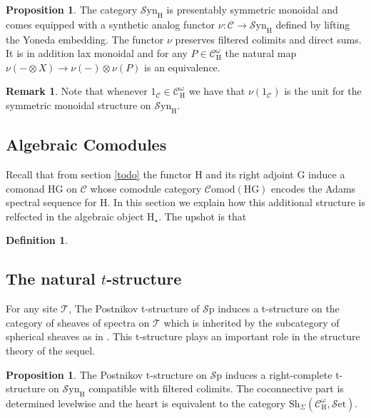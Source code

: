 \documentclass[10pt]{amsart}
\theoremstyle{definition}
\numberwithin{figure}{section}
\numberwithin{equation}{section}
\newtheorem{proposition}[figure]{Proposition}
\newtheorem{definition}[figure]{Definition}
\newtheorem{remark}[figure]{Remark}
\newcommand{\cC}{\mathcal{C}}
\newcommand{\cT}{\mathcal{T}}
\newcommand{\one}{\mathrm{1}}
\theoremstyle{cited}
\newcommand{\Sp}{{\mathcal{S}\mathrm{p}}}
\newcommand{\Set}{{\mathcal{S}\mathrm{et}}}
\newcommand{\Sh}{\mathrm{Sh}}
\newcommand{\Syn}{\mathcal{S}\mathrm{yn}}
\renewcommand{\H}{\mathrm{H}}
\newcommand{\G}{\mathrm{G}}
\newcommand{\Comod}{\mathcal{C}\mathrm{omod}}
\begin{document}
\begin{proposition}
  The category $\Syn_\H$ is presentably symmetric monoidal and comes equipped with a synthetic analog functor $\nu:\cC\to \Syn_\H$ defined by lifting the Yoneda embedding. The functor $\nu$ preserves filtered colimits and direct sums. It is in addition lax monoidal and for any $P\in \cC^\omega_\H$ the natural map $\nu(-\otimes X)\to \nu(-)\otimes \nu(P)$ is an equivalence.
\end{proposition}

\begin{remark}
  Note that whenever $\one_{\cC}\in \cC^\omega_\H$ we have that $\nu(\one_{\cC})$ is the unit for the symmetric monoidal structure on $\Syn_{\H}$.
\end{remark}

\subsection{Algebraic Comodules}

Recall that from section \ref{todo} the functor $\H$ and its right adjoint $\G$ induce a comonad $\H\G$ on $\cC$ whose comodule category $\Comod(\H\G)$ encodes the Adams spectral sequence for $\H$. In this section we explain how this additional structure is relfected in the algebraic object $\H_\star$. The upshot is that 

\begin{definition}
  
\end{definition}

\subsection{The natural $t$-structure}

For any site $\cT$, The Postnikov t-structure of $\Sp$ induces a t-structure on the category of sheaves of spectra on $\cT$ which is inherited by the subcategory of spherical sheaves as in \cite{todo}. This t-structure plays an important role in the structure theory of the sequel.

\begin{proposition}
  The Postnikov t-structure on $\Sp$ induces a right-complete t-structure on $\Syn_{\H}$ compatible with filtered colimits. The coconnective part is determined levelwise and the heart is equivalent to the category $\Sh_{\Sigma}(\cC_{\H}^\omega, \Set)$.
\end{proposition}
\end{document}
